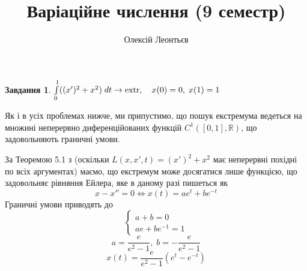 \documentclass[12pt]{article} %
\title{Варіаційне числення (9 семестр)}
\author{Олексій Леонтьєв}
\newtheorem{prob}{Завдання}
\newcommand{\dt}{\;dt}
\let\oldint\int
\renewcommand{\int}{\oldint\limits}
\newcommand{\extr}{\mbox{\normalfont extr}}
\begin{document}
\maketitle
\begin{prob}{}\; $\int_0^1((x')^2+x^2)\dt\to\extr,\quad x(0)=0,\;x(1)=1$\end{prob}
Як і в усіх проблемах нижче, ми припустимо, що пошук екстремума ведеться на множині неперервно диференційованих функцій $C^1([0,1],\mathbb{R})$,
що задовольняють граничні умови.

За Теоремою 5.1 з \cite{tb} (оскільки $L(x,x',t)=(x')^2+x^2$ має неперервні похідні по всіх аргументах)
маємо, що екстремум може досягатися лише функцією, що задовольняє рівняння Ейлера, яке в даному разі пишеться як
\[x-x''=0\iff x(t)=ae^t+be^{-t}\]
Граничні умови приводять до
\[\begin{cases}a+b=0\\ae+be^{-1}=1\end{cases}\]
\[a=\frac{e}{e^2-1},\;b=-\frac{e}{e^2-1}\]
\[x(t)=\frac{e}{e^2-1}(e^t-e^{-t})\]
\end{document}
